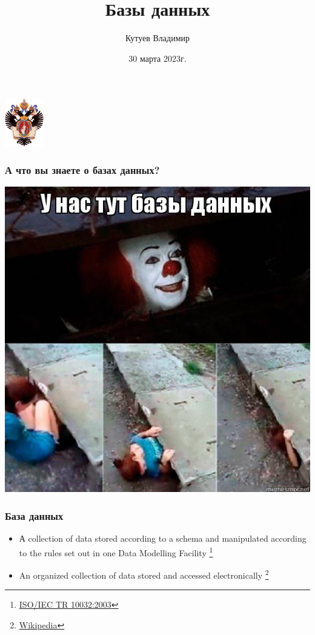 \documentclass[aspectratio=169]{beamer}
\title[Базы данных]{Базы данных}
\subtitle[]{}
\institute[СПбГУ]{
Программная инженерия \\
Санкт-Петербургский государственный университет
}
\author[Кутуев Владимир]{Кутуев Владимир}
\date{30 марта 2023г.}
\begin{document}
{
\begin{frame}
  \includegraphics[width=1.7cm]{pictures/SPbGU_Logo.png}
  \vspace{-20pt}
  \begin{center}
    \titlepage
  \end{center}
\end{frame}
}

\begin{frame}[fragile]
  \transwipe[direction=90]
  \frametitle{А что вы знаете о базах данных?}
  
  \begin{center}
    \includegraphics[height=.85\textheight]{pictures/Mem1.jpg}
  \end{center}
\end{frame}


\begin{frame}[fragile]
  \transwipe[direction=90]
  \frametitle{База данных}
  
  \begin{itemize}
    \item А collection of data stored according to a schema and manipulated according to the rules set out in one Data Modelling Facility \footnote{\href{https://www.iso.org/obp/ui/\#iso:std:iso-iec:tr:10032:ed-1:v1:en}{ISO/IEC TR 10032:2003}}
    \item An organized collection of data stored and accessed electronically \footnote{\href{https://en.wikipedia.org/wiki/Database}{Wikipedia}}
  \end{itemize}
\end{frame}
\end{document}
